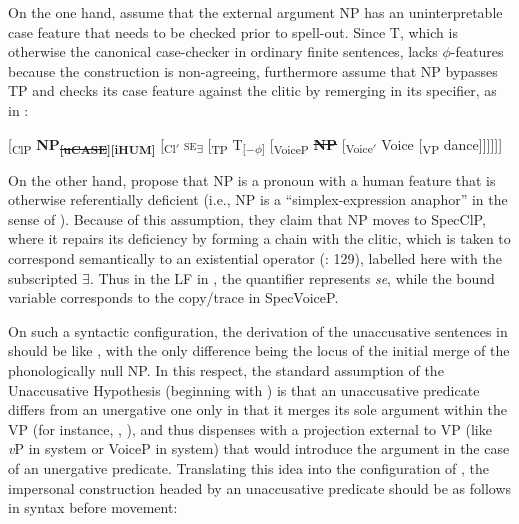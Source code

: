 \documentclass[output=paper,
modfonts,nonflat,
newtxmath
]{langsci/langscibook}
\begin{document}
\noindent On the one hand, \citet{riverosheppard2003} assume that the external argument NP has an uninterpretable case feature that needs to be checked prior to spell-out. Since T, which is otherwise the canonical case-checker in ordinary finite sentences, lacks $\phi$-features because the construction is non-agreeing, \citet{riverosheppard2003} furthermore assume that NP bypasses TP and checks its case feature against the clitic by remerging in its specifier, as in :

\begin{exe} 
\ex \label{ex:lenardic: 15} {[\textsubscript{ClP} \textbf{NP}\textsubscript{\textbf{\st{[uCASE}][iHUM]}} [\textsubscript{Cl$'$} \textsc{se}\textsubscript{\textbf{$\exists$}} [\textsubscript{TP} T\textsubscript{[$-\phi$]} [\textsubscript{VoiceP} \textbf{\st{NP}} [\textsubscript{Voice$'$} Voice [\textsubscript{VP} dance]]]]]]}
\end{exe} \par

\noindent On the other hand, \citet{riverosheppard2003} propose that  NP is a pronoun with a human feature that is otherwise referentially deficient (i.e., NP is a “simplex-expression anaphor” in the sense of \citealt{reinhartreuland1993}). Because of this assumption, they claim that NP moves to SpecClP, where it repairs its deficiency by forming a chain with the clitic, which is taken to correspond semantically to an existential operator (\citealt{riverosheppard2003}: 129), labelled here with the subscripted {$\exists$}. Thus in the LF in , the quantifier represents \textit{se}, while the bound variable corresponds to the copy/trace in SpecVoiceP. \par

On such a syntactic configuration, the derivation of the unaccusative sentences in  should be like , with the only difference being the locus of the initial merge of the phonologically null NP. In this respect, the standard assumption of the Unaccusative Hypothesis (beginning with \citealt{perlmutter1978}) is that an unaccusative predicate differs from an unergative one only in that it merges its sole argument within the VP (for instance, \citealt{burzio1986}, \citealt{alexiadouet2004}), and thus dispenses with a projection external to VP (like \textit{v}P in  system or VoiceP in  system) that would introduce the argument in the case of an unergative predicate. Translating this idea into the configuration of \citet{riverosheppard2003}, the impersonal construction headed by an unaccusative predicate should be as follows in syntax before movement:
\end{document}
